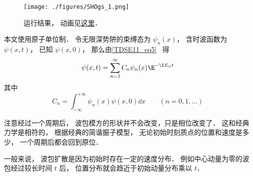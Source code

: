 

\begin{figure}[ht]
\centering
\texttt{[image: ./figures/SHOgs\_1.png]}
\caption{运行结果， 动画见\href{https://wuli.wiki/apps/SHOgs.html}{这里}．} \label{SHOgs_fig1}
\end{figure}

本文使用原子单位制． 令无限深势阱的束缚态为 $\psi_n(x)$， 含时波函数为 $\psi(x, t)$， 已知 $\psi(x, 0)$， 那么由\autoref{TDSE11_eq5}~ 得
\begin{equation}
\psi(x, t) = \sum_{n=1}^\infty C_n\psi_n(x)\E^{-\I E_n t}
\end{equation}
其中
\begin{equation}
C_n = \int_{-\infty}^{+\infty} \psi_n(x)\psi(x, 0) \dd{x} \qquad (n=0,1,\dots)
\end{equation}

注意经过一个周期后， 波包模方的形状并不会改变，只是相位改变了． 这和经典力学是相符的， 根据经典的简谐振子模型， 无论初始时刻质点的位置和速度是多少， 一个周期后都会回到原位．

一般来说， 波包扩散是因为初始时存在一定的速度分布． 例如中心动量为零的波包经过较长时间 $t$ 后， 位置分布就会趋近于初始动量分布乘以 $t$．

